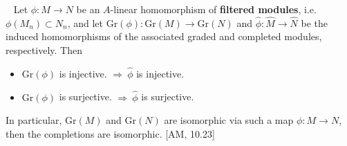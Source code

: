 \documentclass[12pt,a4paper,footinclude=true,headinclude=true]{scrbook} %
\newenvironment{lemma}[2][]
{\renewcommand\theinnercustomlemma{#2}\innercustomlemma[#1]
\begin{mdframed}[backgroundcolor=gray!20]\ }
{\end{mdframed}\endinnercustomprop}
\begin{document}
\begin{lemma}{306}
    Let $\phi:M\to N$ be an $A$-linear homomorphism of \textbf{filtered modules}, i.e. $\phi(M_n)\subset N_n$, and let $\mathrm{Gr}(\phi):\mathrm{Gr}(M)\to\mathrm{Gr}(N)$ and $\widehat{\phi}:\widehat{M}\to\widehat{N}$ be the induced homomorphisms of the associated graded and completed modules, respectively. Then
    \begin{itemize}
        \item[(a)] $\mathrm{Gr}(\phi)$ is injective. $\Rightarrow\ \widehat{\phi}$ is injective. 
        \item[(b)] $\mathrm{Gr}(\phi)$ is surjective. $\Rightarrow\ \widehat{\phi}$ is surjective. 
    \end{itemize}
    In particular, $\mathrm{Gr}(M)$ and $\mathrm{Gr}(N)$ are isomorphic via such a map $\phi:M\to N$, then the completions are isomorphic. [AM, 10.23]
\end{lemma}
\end{document}
